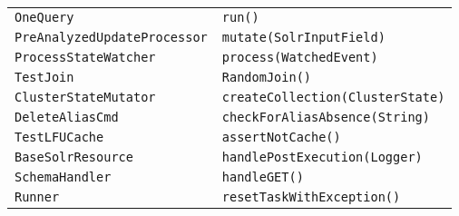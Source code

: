 \begin{center}
\begin{longtable}{ll}
\lstinline/OneQuery/&{\lstinline/run()/}\\
\lstinline/PreAnalyzedUpdateProcessor/&{\lstinline/mutate(SolrInputField)/}\\
\lstinline/ProcessStateWatcher/&{\lstinline/process(WatchedEvent)/}\\
\lstinline/TestJoin/&{\lstinline/RandomJoin()/}\\
\lstinline/ClusterStateMutator/&{\lstinline/createCollection(ClusterState)/}\\
\lstinline/DeleteAliasCmd/&{\lstinline/checkForAliasAbsence(String)/}\\
\lstinline/TestLFUCache/&{\lstinline/assertNotCache()/}\\
\lstinline/BaseSolrResource/&{\lstinline/handlePostExecution(Logger)/}\\
\lstinline/SchemaHandler/&{\lstinline/handleGET()/}\\
\lstinline/Runner/&{\lstinline/resetTaskWithException()/}\\
\end{longtable}
\end{center}

